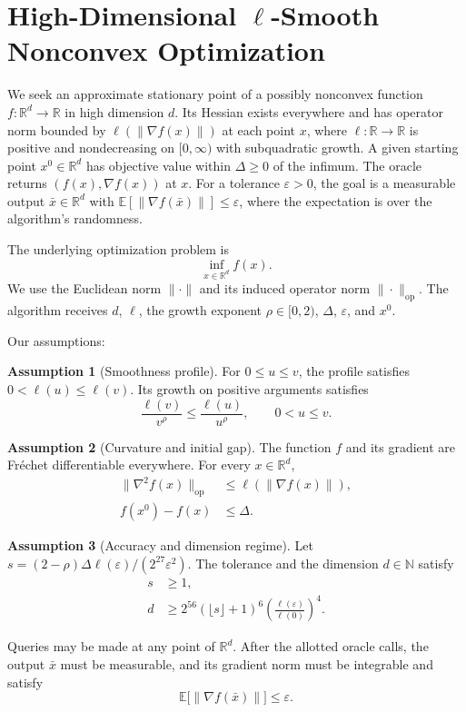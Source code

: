 \documentclass[10pt]{article}
\theoremstyle{definition}
\newtheorem{assumption}{Assumption}
\begin{document}
\section*{High-Dimensional $\ell$-Smooth Nonconvex Optimization}
We seek an approximate stationary point of a possibly nonconvex function $f:\mathbb{R}^d\to\mathbb{R}$ in high dimension $d$. Its Hessian exists everywhere and has operator norm bounded by $\ell(\|\nabla f(x)\|)$ at each point $x$, where $\ell:\mathbb{R}\to\mathbb{R}$ is positive and nondecreasing on $[0,\infty)$ with subquadratic growth. A given starting point $x^0\in\mathbb{R}^d$ has objective value within $\Delta\geq 0$ of the infimum. The oracle returns $(f(x),\nabla f(x))$ at $x$. For a tolerance $\varepsilon>0$, the goal is a measurable output $\bar{x}\in\mathbb{R}^d$ with $\mathbb{E}[\|\nabla f(\bar{x})\|]\leq\varepsilon$, where the expectation is over the algorithm's randomness.

The underlying optimization problem is
\[
\inf_{x\in\mathbb{R}^d} f(x).
\]
We use the Euclidean norm $\|\cdot\|$ and its induced operator norm $\|\cdot\|_{\mathrm{op}}$. The algorithm receives $d$, $\ell$, the growth exponent $\rho\in[0,2)$, $\Delta$, $\varepsilon$, and $x^0$.

Our assumptions:
\begin{assumption}[Smoothness profile]
For $0\leq u\leq v$, the profile satisfies $0<\ell(u)\leq\ell(v)$. Its growth on positive arguments satisfies
\[
\frac{\ell(v)}{v^\rho}\leq\frac{\ell(u)}{u^\rho},\qquad 0<u\leq v.
\]
\end{assumption}

\begin{assumption}[Curvature and initial gap]
The function $f$ and its gradient are Fr\'echet differentiable everywhere. For every $x\in\mathbb{R}^d$,
\[
\begin{aligned}
\|\nabla^2 f(x)\|_{\mathrm{op}} &\leq \ell(\|\nabla f(x)\|),\\
f(x^0)-f(x) &\leq \Delta.
\end{aligned}
\]
\end{assumption}

\begin{assumption}[Accuracy and dimension regime]
Let $s=(2-\rho)\Delta\ell(\varepsilon)/(2^{27}\varepsilon^2)$. The tolerance and the dimension $d\in\mathbb{N}$ satisfy
\[
\begin{aligned}
s &\geq 1,\\
d &\geq 2^{56}(\lfloor s\rfloor+1)^6
\left(\frac{\ell(\varepsilon)}{\ell(0)}\right)^4.
\end{aligned}
\]
\end{assumption}

Queries may be made at any point of $\mathbb{R}^d$. After the allotted oracle calls, the output $\bar{x}$ must be measurable, and its gradient norm must be integrable and satisfy
\[
\mathbb{E}\bigl[\|\nabla f(\bar{x})\|\bigr]\leq\varepsilon.
\]
\end{document}
